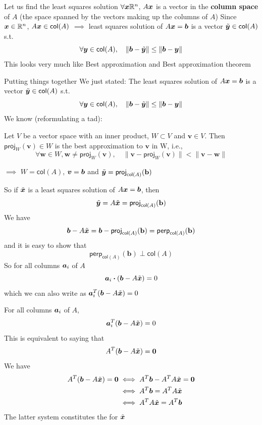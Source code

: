 \documentclass[aspectratio=169]{beamer}\usepackage[]{graphicx}\usepackage[]{xcolor}
\begin{document}
\begin{frame}{Let us find the least squares solution}
$\forall \bm{x}\mathbb{R}^n$, $A\bm{x}$ is a vector in the \textbf{column space} of $A$ (the space spanned by the vectors making up the columns of $A$)
\vfill
Since $\bm{x}\in\mathbb{R}^n$, $A\bm{x}\in\mathsf{col}(A)$
\vfill
$\implies$ least squares solution of $A\bm{x}=\bm{b}$ is a vector $\tilde{\bm{y}}\in\mathsf{col}(A)$ s.t.
\[
\forall\bm{y}\in\mathsf{col}(A),\quad\|\bm{b}-\tilde{\bm{y}}\|\leq\|\bm{b}-\bm{y}\|
\]
\vfill
This looks very much like Best approximation and Best approximation theorem
\end{frame}

\begin{frame}{Putting things together}
We just stated: The least squares solution of $A\bm{x}=\bm{b}$ is a vector $\tilde{\bm{y}}\in\mathsf{col}(A)$ s.t.
\[
\forall\bm{y}\in\mathsf{col}(A),\quad\|\bm{b}-\tilde{\bm{y}}\|\leq\|\bm{b}-\bm{y}\|
\]
\vfill
We know (reformulating a tad):
\begin{theorem}
Let $V$ be a vector space with an inner product, $W\subset V$ and $\mathbf{v}\in V$. Then $\mathsf{proj}_W(\mathbf{v})\in W$ is the best approximation to $\mathbf{v}$ in W, i.e.,
\[
\forall\mathbf{w}\in W, \mathbf{w}\neq\mathsf{proj}_W(\mathbf{v}), \quad
\|\mathbf{v}-\mathsf{proj}_W(\mathbf{v})\| < \|\mathbf{v}-\mathbf{w}\|
\]
\end{theorem}
\vfill
$\implies$ $W=\mathsf{col}(A)$, $\bm{v}=\bm{b}$ and $\tilde{\bm{y}}=\mathsf{proj}_{\mathsf{col}(A)}(\mathbf{b})$
\end{frame}

\begin{frame}
So if $\tilde{\bm{x}}$ is a least squares solution of $A\bm{x}=\bm{b}$, then
\[
\tilde{\bm{y}} = A\tilde{\bm{x}} = \mathsf{proj}_{\mathsf{col}(A)}(\mathbf{b})
\]
\vfill
We have
\[
\bm{b}-A\tilde{\bm{x}} = \bm{b}-\mathsf{proj}_{\mathsf{col}(A)}(\mathbf{b}) 
= \mathsf{perp}_{\mathsf{col}(A)}(\mathbf{b})
\]
and it is easy to show that
\[
\mathsf{perp}_{\mathsf{col}(A)}(\mathbf{b}) \perp \mathsf{col}(A)
\]
\vfill
So for all columns $\bm{a}_i$ of $A$
\[
\bm{a}_i\boldsymbol{\cdot}(\bm{b}-A\tilde{\bm{x}}) = 0
\]
which we can also write as $\bm{a}_i^T(\bm{b}-A\tilde{\bm{x}}) = 0$
\end{frame}

\begin{frame}
For all columns $\bm{a}_i$ of $A$,
\[\bm{a}_i^T(\bm{b}-A\tilde{\bm{x}}) = 0
\]
\vfill
This is equivalent to saying that
\[
A^T(\bb-A\tilde\bx) = \b0
\]
\vfill
We have
\begin{align*}
A^T(\bb-A\tilde\bx) = \b0 &\iff A^T\bb - A^TA\tilde\bx = \b0 \\
&\iff A^T\bb = A^TA\tilde\bx \\
&\iff A^TA\tilde\bx = A^T\bb
\end{align*}
The latter system constitutes the  for $\tilde{\bm{x}}$
\end{frame}
\end{document}
